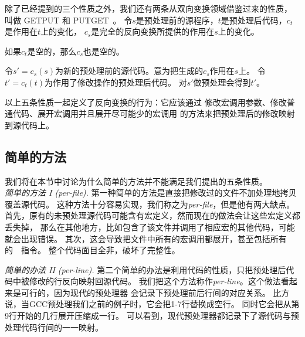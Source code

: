 除了已经提到的三个性质之外，我们还有两条从双向变换领域借鉴过来的性质，
叫做 GETPUT 和 PUTGET~\parencite{Foster:2007}。
令$s$是预处理前的源程序，$t$是预处理后代码，$c_t$是作用在$t$上的变化，
$c_s$是完全的反向变换所提供的作用在$s$上的变化。

\begin{decision}[GETPUT]
  如果$c_t$是空的，那么$c_s$也是空的。
\end{decision}

\begin{decision}[PUTGET]
  令$s'=c_s(s)$为新的预处理前的源代码。意为把生成的$c_s$作用在$s$上。
  令$t'=c_t(t)$为作用了修改操作的预处理后代码。
  对$s'$做预处理会得到$t'$。
\end{decision}


以上五条性质一起定义了反向变换的行为：它应该通过
修改宏调用参数、修改普通代码、展开宏调用并且展开尽可能少的宏调用
的方法来把预处理后的修改映射到源代码上。 

\subsection{简单的方法}\label{sec:naive}
我们将在本节中讨论为什么简单的方法并不能满足我们提出的五条性质。\\

\noindent\emph{简单的方法 I (per-file).}
第一种简单的方法是直接把修改过的文件不加处理地拷贝覆盖源代码。
这种方法十分容易实现，我们称之为\emph{per-file}，但是他有两大缺点。
首先，原有的未预处理源代码可能含有宏定义，然而现在的做法会让这些宏定义都丢失掉，
那么在其他地方，比如包含了该文件并调用了相应宏的其他代码，可能就会出现错误。
其次，这会导致把文件中所有的宏调用都展开，甚至包括所有的~~指令。
整个代码面目全非，破坏了完整性。

\noindent\emph{简单的办法 II (per-line).}
第二个简单的办法是利用代码的性质，只把预处理后代码中被修改的行反向映射回源代码。
我们把这个方法称作\emph{per-line}。这个做法看起来是可行的，因为现代的预处理器
会记录下预处理前后行间的对应关系。
比方说，当GCC预处理我们之前的例子时，它会把1-7行替换成空行。
同时它会把从第9行开始的几行展开压缩成一行。
可以看到，现代预处理器都记录下了源代码与预处理代码行间的一一映射。

